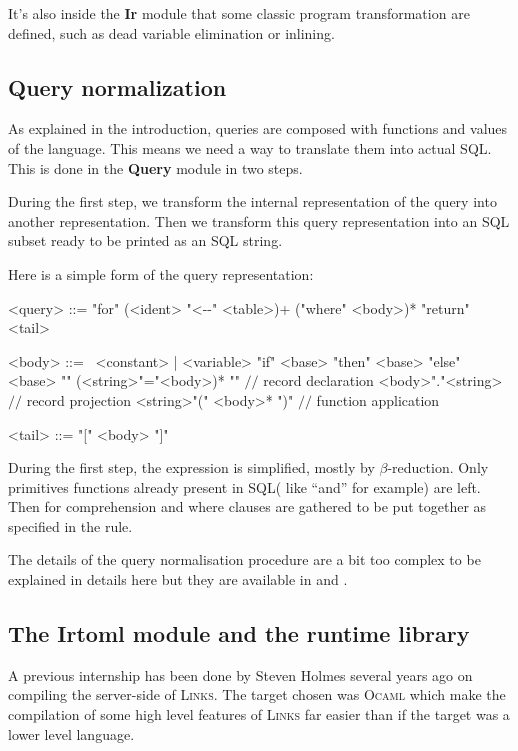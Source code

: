 \documentclass[11pt]{article}
\newcommand\mysc[1]{{\rmfamily\textsc{#1}}\xspace}
\newcommand\links{\mysc{Links}}
\newcommand\sql{\mysc{SQL}}
\newcommand\ocaml{\mysc{Ocaml}}
\newcommand\module[1]{{\bf #1}}
\renewcommand\comment[1]{{\color{gray} $//$ #1}}
\begin{document}
It's also inside the \module{Ir} module that some classic program transformation are defined, such as dead variable elimination or inlining.

\subsection{Query normalization \label{querynorm}}

As explained in the introduction, queries are composed with functions and values of the language. This means we need a way to translate them into actual \sql. This is done in the \module{Query} module in two steps.

During the first step, we transform the internal representation of the query into another representation. Then we transform this query representation into an \sql subset ready to be printed as an \sql string.

Here is a simple form of the query representation:

\begin{grammar}
<query> ::= "for" (<ident> "<-\--" <table>)+ ("where" <body>)* "return" <tail>

<body> ::= \ 
\alt <constant> | <variable>
\alt "if" <base> "then" <base> "else" <base>
\alt "{" (<string>"="<body>)* "}" \comment{record declaration}
\alt <body>"."<string> \comment{record projection}
\alt <string>"(" <body>* ")" \comment{function application}

<tail> ::= "[" <body> "]"
\end{grammar}

During the first step, the expression is simplified, mostly by $\beta$-reduction. Only primitives functions already present in \sql ( like ``and'' for example) are left. Then for comprehension and where clauses are gathered to be put together as specified in the  rule.

The details of the query normalisation procedure are a bit too complex to be explained in details here but they are available in \cite{links:querycomp} and \cite{links:querynorm}.

\subsection{The Irtoml module and the runtime library \label{irtoml}}

A previous internship \cite{links:comp} has been done by Steven Holmes several years ago on compiling the server-side of \links. The target chosen was \ocaml which make the compilation of some high level features of \links far easier than if the target was a lower level language. 
\end{document}
